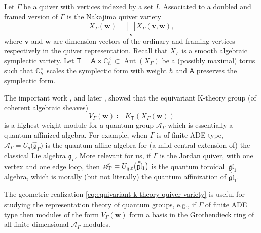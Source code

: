 \documentclass[10pt,a4paper]{amsart}
\numberwithin{equation}{section}
\renewcommand{\hat}[1]{\widehat{#1}}
\newcommand{\hhat}[1]{\hat{\vphantom{\rule{1pt}{5.5pt}}\smash{\hat{#1}}}}
\renewcommand{\vec}[1]{\bm{#1}}
\newcommand{\cat}[1]{\mathsf{#1}}
\newcommand{\lie}[1]{\mathfrak{#1}}
\newcommand{\bC}{\mathbb{C}}
\newcommand{\sA}{\mathsf{A}}
\newcommand{\sT}{\mathsf{T}}
\newcommand{\scA}{\mathscr{A}}
\DeclareMathOperator{\Aut}{Aut}
\begin{document}
\begin{MyParagraph}\label{sec:geometric-realization-modules}
Let $\Gamma$ be a quiver with vertices indexed by a set $I$.
Associated to a doubled and framed version of $\Gamma$ is the Nakajima
quiver variety
\[ X_\Gamma(\vec w) = \bigsqcup_{\vec v} X_\Gamma(\vec v, \vec w), \]
where $\vec v$ and $\vec w$ are dimension vectors of the ordinary and
framing vertices respectively in the quiver representation. Recall
that $X_\Gamma$ is a smooth algebraic symplectic variety. Let
$\sT = \sA \times \bC_{\hbar}^\times \subset \Aut(X_\Gamma)$ be a
(possibly maximal) torus such that $\bC_{\hbar}^\times$ scales the
symplectic form with weight $\hbar$ and $\sA$ preserves the symplectic
form.

The important work \cite{Nakajima2001}, and later \cite{Maulik2019,
 Okounkov2016}, showed that the equivariant K-theory group (of
coherent algebraic sheaves)
\begin{equation} \label{eq:equivariant-k-theory-quiver-variety}
 V_\Gamma(\vec w) \coloneqq K_\sT(X_\Gamma(\vec w)) %
\end{equation}
is a highest-weight module for a quantum group $\scA_\Gamma$ which is
essentially a quantum affinized algebra. For example, when $\Gamma$ is
of finite ADE type, $\scA_\Gamma = U_q\big(\hat{\lie{g}}_\Gamma\big)$ is the
quantum affine algebra for (a mild central extension of) the classical
Lie algebra $\lie{g}_\Gamma$. More relevant for us, if $\Gamma$ is the
Jordan quiver, with one vertex and one edge loop, then
$\scA_\Gamma = U_{q,t}\big(\hhat{\lie{gl}}_1\big)$ is the quantum toroidal~$\lie{gl}_1$ algebra, which is morally (but not literally) the quantum
affinization of $\hat{\lie{gl}}_1$.

The geometric realization
\eqref{eq:equivariant-k-theory-quiver-variety} is useful for studying
the representation theory of quantum groups, e.g., if $\Gamma$ of finite ADE
type then modules of the form $V_\Gamma(\vec w)$ form a basis in the
Grothendieck ring of all finite-dimensional $\scA_\Gamma$-modules.
\end{MyParagraph}
\end{document}
